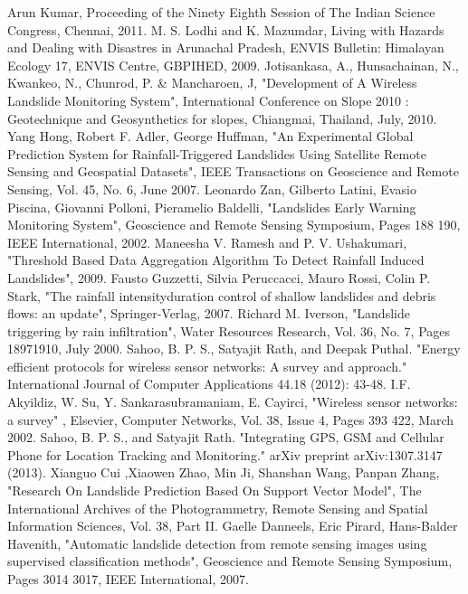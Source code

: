 \documentclass[conference]{IEEEtran}
\begin{document}
\begin{thebibliography}{1}

Arun Kumar, Proceeding of the Ninety Eighth Session of The Indian Science Congress, Chennai, 2011.
M. S. Lodhi and K. Mazumdar, Living with Hazards and Dealing with Disastres in Arunachal Pradesh, ENVIS Bulletin: Himalayan Ecology 17, ENVIS Centre, GBPIHED, 2009.
Jotisankasa, A., Hunsachainan, N., Kwankeo, N., Chunrod, P. \& Mancharoen, J, "Development of A Wireless Landslide Monitoring System", International Conference on Slope 2010 : Geotechnique and Geosynthetics for slopes, Chiangmai, Thailand, July, 2010.
Yang Hong, Robert F. Adler, George Huffman, "An Experimental Global Prediction System for Rainfall-Triggered Landslides Using Satellite Remote Sensing and Geospatial Datasets", IEEE Transactions on Geoscience and Remote Sensing, Vol. 45, No. 6, June 2007.
Leonardo Zan, Gilberto Latini, Evasio Piscina, Giovanni Polloni, Pieramelio Baldelli, "Landslides Early Warning Monitoring System", Geoscience and Remote Sensing Symposium, Pages 188 190, IEEE International, 2002.
Maneesha V. Ramesh and P. V. Ushakumari, "Threshold Based Data Aggregation Algorithm To Detect Rainfall Induced Landslides", 2009.
Fausto Guzzetti, Silvia Peruccacci, Mauro Rossi, Colin P. Stark, "The rainfall intensityduration control of shallow landslides and debris flows: an update", Springer-Verlag, 2007.
Richard M. Iverson, "Landslide triggering by rain infiltration", Water Resources Research, Vol. 36, No. 7, Pages 18971910, July 2000.
Sahoo, B. P. S., Satyajit Rath, and Deepak Puthal. "Energy efficient protocols for wireless sensor networks: A survey and approach." International Journal of Computer Applications 44.18 (2012): 43-48.
I.F. Akyildiz, W. Su, Y. Sankarasubramaniam, E. Cayirci, "Wireless sensor networks: a survey" , Elsevier, Computer Networks, Vol. 38, Issue 4, Pages 393 422, March 2002.
Sahoo, B. P. S., and Satyajit Rath. "Integrating GPS, GSM and Cellular Phone for Location Tracking and Monitoring." arXiv preprint arXiv:1307.3147 (2013).
Xianguo Cui ,Xiaowen Zhao, Min Ji, Shanshan Wang, Panpan Zhang, "Research On Landslide Prediction Based On Support Vector Model", The International Archives of the Photogrammetry, Remote Sensing and Spatial Information Sciences, Vol. 38, Part II.
Gaelle Danneels, Eric Pirard, Hans-Balder Havenith, "Automatic landslide detection from remote sensing images using supervised classification methods", Geoscience and Remote Sensing Symposium, Pages 3014 3017,
IEEE International, 2007.


\end{thebibliography}
\end{document}
